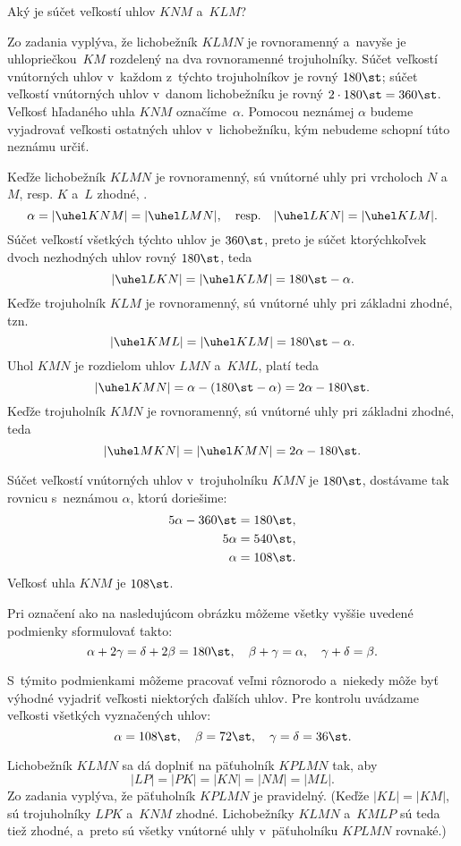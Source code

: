 {%
\napad
Aký je súčet veľkostí uhlov $KNM$ a~$KLM$?

\riesenie
Zo zadania vyplýva, že lichobežník $KLMN$ je rovnoramenný a~navyše je
uhlopriečkou~$KM$ rozdelený na dva rovnoramenné trojuholníky.
Súčet veľkostí vnútorných uhlov v~každom z~týchto trojuholníkov je rovný
$180\st$;
súčet veľkostí vnútorných uhlov v~danom lichobežníku je rovný
$2\cdot180\st=360\st$.
Veľkosť hľadaného uhla $KNM$ označíme~$\alpha$.
Pomocou neznámej $\alpha$ budeme vyjadrovať veľkosti ostatných uhlov v~lichobežníku, kým nebudeme schopní túto neznámu určiť.

Keďže lichobežník $KLMN$ je rovnoramenný, sú vnútorné uhly pri vrcholoch $N$ a~$M$, resp. $K$ a~$L$ zhodné, \tj.
$$
\alpha=|\uhel KNM|=|\uhel LMN|,
\quad\text{resp.}\quad
|\uhel LKN|=|\uhel KLM|.
$$
Súčet veľkostí všetkých týchto uhlov je $360\st$, preto je súčet ktorýchkoľvek
dvoch nezhodných uhlov rovný $180\st$, teda
$$
|\uhel LKN|=|\uhel KLM|=180\st-\alpha.
$$
Keďže trojuholník $KLM$ je rovnoramenný, sú vnútorné uhly pri základni
zhodné, tzn.
$$
|\uhel KML|=|\uhel KLM|=180\st-\alpha.
$$
Uhol $KMN$ je rozdielom uhlov $LMN$ a~$KML$, platí teda
$$
|\uhel KMN|=\alpha-(180\st-\alpha)=2\alpha-180\st.
$$
Keďže trojuholník $KMN$ je rovnoramenný, sú vnútorné uhly pri základni
zhodné, teda
$$
|\uhel MKN|=|\uhel KMN|=2\alpha-180\st.
$$
%

Súčet veľkostí vnútorných uhlov v~trojuholníku $KMN$ je $180\st$, dostávame
tak rovnicu s~neznámou $\alpha$, ktorú doriešime:
$$
\aligned
5\alpha-360\st&=180\st,\\
5\alpha&=540\st,\\
\alpha&=108\st.
\endaligned
$$
Veľkosť uhla $KNM$ je $108\st$.

\poznamka
Pri označení ako na nasledujúcom obrázku môžeme všetky vyššie uvedené
podmienky sformulovať takto:
$$
\alpha+2\gamma=\delta+2\beta=180\st,
\quad
\beta+\gamma=\alpha,
\quad
\gamma+\delta=\beta.
$$
%

S~týmito podmienkami môžeme pracovať veľmi rôznorodo a~niekedy môže byť výhodné
vyjadriť veľkosti niektorých ďalších uhlov.
Pre kontrolu uvádzame veľkosti všetkých vyznačených uhlov:
$$
\alpha=108\st,
\quad
\beta=72\st,
\quad
\gamma=\delta=36\st.
$$

\ineriesenie
Lichobežník $KLMN$ sa dá doplniť na päťuholník $KPLMN$ tak, aby
$$
|LP|=|PK|=|KN|=|NM|=|ML|.
$$
Zo zadania vyplýva, že päťuholník $KPLMN$ je pravidelný.
(Keďže $|KL|=|KM|$, sú trojuholníky $LPK$ a~$KNM$ zhodné.
Lichobežníky $KLMN$ a~$KMLP$ sú teda tiež zhodné, a~preto sú
všetky vnútorné uhly v~päťuholníku $KPLMN$ rovnaké.)
%

}
